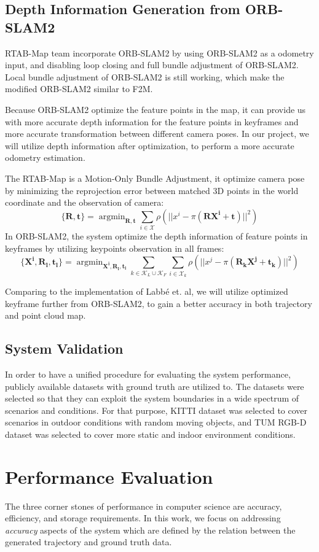 \documentclass[12pt]{article}
\DeclareMathOperator*{\argmin}{argmin}
\begin{document}
\subsection{Depth Information Generation from ORB-SLAM2}
RTAB-Map team incorporate ORB-SLAM2 by using ORB-SLAM2 as a odometry input, and disabling loop closing and full bundle adjustment of ORB-SLAM2\cite{labbe2019rtab}. Local bundle adjustment of ORB-SLAM2 is still working, which make the modified ORB-SLAM2 similar to F2M. 

Because ORB-SLAM2 optimize the feature points in the map, it can provide us with more accurate depth information for the feature points\cite{mur2017orb} in keyframes and more accurate transformation between different camera poses. In our project, we will utilize depth information after optimization, to perform a more accurate odometry estimation.

The RTAB-Map is a Motion-Only Bundle Adjustment, it optimize camera pose by minimizing the reprojection error between matched 3D points in the world coordinate and the observation of camera:
$$
\{\mathbf{R,t}\}= \argmin_{\mathbf{R,t}}\sum_{i\in\mathcal{X}}\rho(||x^i-\pi(\mathbf{RX^i+t})||^2) 
$$ 
In ORB-SLAM2, the system optimize the depth information of feature points in keyframes by utilizing keypoints observation in all frames\cite{mur2017orb}:
$$
\{\mathbf{X^i,R_l,t_l}\}= \argmin_{\mathbf{X^i,R_l,t_l}}\sum_{k\in\mathcal{K}_L\cup\mathcal{K}_F} \sum_{i\in\mathcal{X}_k}\rho(||x^j-\pi(\mathbf{R_kX^j+t_k})||^2) 
$$ 

Comparing to the implementation of Labb{\'e} et. al\cite{labbe2019rtab}, we will utilize optimized keyframe further from ORB-SLAM2, to gain a better accuracy in both trajectory and point cloud map. 

\subsection{System Validation}
In order to have a unified procedure for evaluating the system performance, publicly available datasets with ground truth are utilized to. The datasets were selected so that they can exploit the system boundaries in a wide spectrum of scenarios and conditions. For that purpose, KITTI dataset \cite{Geiger2012CVPR} was selected to cover scenarios in outdoor conditions with random moving objects, and TUM RGB-D dataset \cite{sturm2012benchmark} was selected to cover more static and indoor environment conditions.

\section{Performance Evaluation}
The three corner stones of performance in computer science are accuracy, efficiency, and storage requirements. In this work, we focus on addressing \textit{accuracy} aspects of the system which are defined by the relation between the generated trajectory and ground truth data. 
\end{document}

